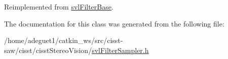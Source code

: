 Reimplemented from \hyperlink{classsvl_filter_base_ab689b852e2cee497fcd0ca6708105e17}{svl\-Filter\-Base}.



The documentation for this class was generated from the following file\-:\begin{DoxyCompactItemize}
\item 
/home/adeguet1/catkin\-\_\-ws/src/cisst-\/saw/cisst/cisst\-Stereo\-Vision/\hyperlink{svl_filter_sampler_8h}{svl\-Filter\-Sampler.\-h}\end{DoxyCompactItemize}
